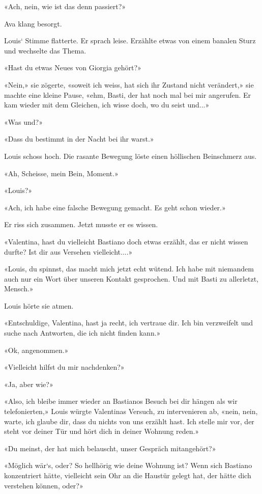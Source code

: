 «Ach, nein, wie ist das denn passiert?»

Ava klang besorgt.

Louis` Stimme flatterte. Er sprach leise. Erzählte etwas von einem
banalen Sturz und wechselte das Thema.

«Hast du etwas Neues von Giorgia gehört?»

«Nein,» sie zögerte, «soweit ich weiss, hat sich ihr Zustand nicht
verändert,» sie machte eine kleine Pause, «ehm, Basti, der hat noch mal
bei mir angerufen. Er kam wieder mit dem Gleichen, ich wisse doch, wo du
seist und...»

«Was und?»

«Dass du bestimmt in der Nacht bei ihr warst.»

Louis schoss hoch. Die rasante Bewegung löste einen höllischen
Beinschmerz aus.

«Ah, Scheisse, mein Bein, Moment.»

«Louis?»

«Ach, ich habe eine falsche Bewegung gemacht. Es geht schon wieder.»

Er riss sich zusammen. Jetzt musste er es wissen.

«Valentina, hast du vielleicht Bastiano doch etwas erzählt, das er nicht
wissen durfte? Ist dir aus Versehen vielleicht....»

«Louis, du spinnst, das macht mich jetzt echt wütend. Ich habe mit
niemandem auch nur ein Wort über unseren Kontakt gesprochen. Und mit
Basti zu allerletzt, Mensch.»

Louis hörte sie atmen.

«Entschuldige, Valentina, hast ja recht, ich vertraue dir. Ich bin
verzweifelt und suche nach Antworten, die ich nicht finden kann.»

«Ok, angenommen.»

«Vielleicht hilfst du mir nachdenken?»

«Ja, aber wie?»

«Also, ich bleibe immer wieder an Bastianos Besuch bei dir hängen als
wir telefonierten,» Louis würgte Valentinas Versuch, zu intervenieren
ab, «nein, nein, warte, ich glaube dir, dass du nichts von uns erzählt
hast. Ich stelle mir vor, der steht vor deiner Tür und hört dich in
deiner Wohnung reden.»

«Du meinst, der hat mich belauscht, unser Gespräch mitangehört?»

«Möglich wär`s, oder? So hellhörig wie deine Wohnung ist? Wenn sich
Bastiano konzentriert hätte, vielleicht sein Ohr an die Haustür gelegt
hat, der hätte dich verstehen können, oder?»

